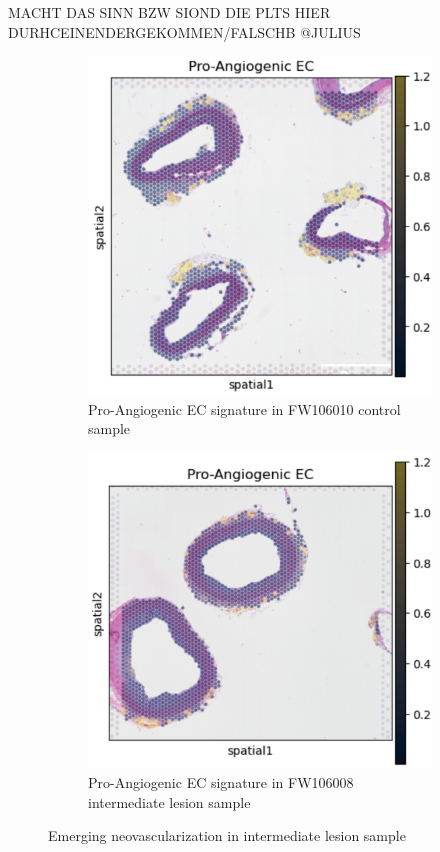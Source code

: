 \documentclass[a4paper,12pt]{article}
\begin{document}
MACHT DAS SINN BZW SIOND DIE PLTS HIER DURHCEINENDERGEKOMMEN/FALSCHB @JULIUS
\begin{figure}[H]
\centering
\begin{subfigure}{0.4\textwidth}
\includegraphics[width=\textwidth]{paecpa10}
\caption{Pro-Angiogenic EC signature in FW106010 control sample}
\label{fig:control_spatial}
\end{subfigure}
\hfill
\begin{subfigure}{0.4\textwidth}
\includegraphics[width=\textwidth]{paecpa11}
\caption{Pro-Angiogenic EC signature in FW106008 intermediate lesion sample}
\label{fig:atherosclerosis_spatial}
\end{subfigure}
\caption{Emerging neovascularization in intermediate lesion sample}
\label{fig:spatial_deconvolution}
\end{figure}
\end{document}
